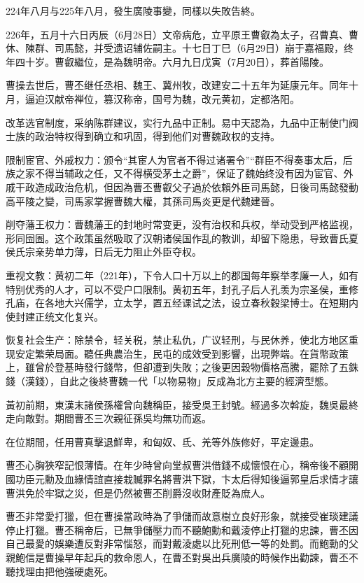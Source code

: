 224年八月与225年八月，發生廣陵事變，同樣以失敗告終。

226年，五月十六日丙辰（6月28日）文帝病危，立平原王曹叡為太子，召曹真、曹休、陳群、司馬懿，并受遗诏辅佐嗣主。十七日丁巳（6月29日）崩于嘉福殿，终年四十岁。曹叡繼位，是為魏明帝。六月九日戊寅（7月20日），葬首陽陵。

曹操去世后，曹丕继任丞相、魏王、冀州牧，改建安二十五年为延康元年。同年十月，逼迫汉献帝禅位，篡汉称帝，国号为魏，改元黄初，定都洛阳。

改革选官制度，采纳陈群建议，实行九品中正制。易中天認為，九品中正制使门阀士族的政治特权得到确立和巩固，得到他们对曹魏政权的支持。

限制宦官、外戚权力：颁令“其宦人为官者不得过诸署令”“群臣不得奏事太后，后族之家不得当辅政之任，又不得横受茅土之爵”，保证了魏始终没有因为宦官、外戚干政造成政治危机，但因為曹丕曹叡父子過於依賴外臣司馬懿，日後司馬懿發動高平陵之變，司馬家掌握曹魏大權，其孫司馬炎更是代魏建晉。

削夺藩王权力：曹魏藩王的封地时常变更，没有治权和兵权，举动受到严格监视，形同囹圄。这个政策虽然吸取了汉朝诸侯国作乱的教训，却留下隐患，导致曹氏夏侯氏宗亲势单力薄，日后无力阻止外臣夺权。

重视文教：黄初二年（221年），下令人口十万以上的郡国每年察举孝廉一人，如有特别优秀的人才，可以不受户口限制。黄初五年，封孔子后人孔羡为宗圣侯，重修孔庙，在各地大兴儒学，立太学，置五经课试之法，设立春秋穀梁博士。在短期内使封建正统文化复兴。

恢复社会生产：除禁令，轻关税，禁止私仇，广议轻刑，与民休养，使北方地区重现安定繁荣局面。聽任典農治生，民屯的成效受到影響，出現弊端。在貨幣政策上，雖曾於登基時發行錢幣，但卻遭到失敗；之後更因穀物價格高騰，罷除了五銖錢（漢錢），自此之後終曹魏一代「以物易物」反成為北方主要的經濟型態。

黃初前期，東漢末諸侯孫權曾向魏稱臣，接受吳王封號。經過多次斡旋，魏吳最終走向敵對。期間曹丕三次親征孫吳均無功而返。

在位期間，任用曹真擊退鮮卑，和匈奴、氐、羌等外族修好，平定邊患。

曹丕心胸狹窄記恨薄情。在年少時曾向堂叔曹洪借錢不成懷恨在心，稱帝後不顧開國功臣元勳及血緣情誼直接栽贓罪名將曹洪下獄，卞太后得知後逼郭皇后求情才讓曹洪免於牢獄之災，但是仍然被曹丕削爵沒收財產貶為庶人。

曹丕非常愛打獵，但在曹操當政時為了爭儲而故意樹立良好形象，就接受崔琰建議停止打獵。曹丕稱帝后，已無爭儲壓力而不聽鮑勳和戴淩停止打獵的忠諫，曹丕因自己最愛的娛樂遭反對非常惱怒，而對戴淩處以比死刑低一等的处罰。而鮑勳的父親鮑信是曹操早年起兵的救命恩人，在曹丕對吳出兵廣陵的時候作出勸諫，曹丕不聽找理由把他強硬處死。

